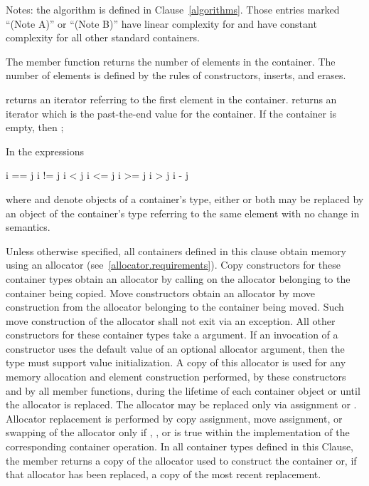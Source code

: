 Notes: the algorithm
is defined in Clause~\ref{algorithms}.
Those entries marked ``(Note A)'' or ``(Note B)''
have linear complexity for  and have constant complexity
for all other standard containers.

\pnum
The member function  returns the number of elements in the container.
The number of elements is defined by the rules of
constructors, inserts, and erases.

\pnum
{}
returns an iterator referring to the first element in the container.
returns an iterator which is the past-the-end value for the container.
If the container is empty, then
;

\pnum
In the expressions
\begin{codeblock}
i == j
i != j
i < j
i <= j
i >= j
i > j
i - j
\end{codeblock}
where  and  denote objects of a container's 
type, either or both may be replaced by an object of the container's
 type referring to the same element with no change in semantics.

\pnum
Unless otherwise specified, all containers defined in this clause obtain memory
using an allocator (see~\ref{allocator.requirements}).
Copy constructors for these container types obtain an allocator by calling
on the allocator belonging to the container being copied.
Move constructors obtain an allocator by move construction from the allocator belonging to
the container being moved. Such move construction of the allocator shall not exit via an
exception.
All other constructors for these container types take a
 argument.
\enternote If an invocation of a constructor uses the default value of an optional
allocator argument, then the  type must support value initialization.
\exitnote
A copy of this allocator is used for any memory allocation and element construction
performed, by these constructors and by all member functions,
during the lifetime of each container object
or until the allocator is replaced. The allocator may be replaced only via assignment or
. Allocator replacement is performed by
copy assignment, move assignment, or swapping of the allocator only if
,
,
or  is true
within the implementation of the corresponding container operation.
In all container types defined in this Clause, the member 
returns a copy of the allocator used to construct the container or, if that allocator
has been replaced, a copy of the most recent replacement.

